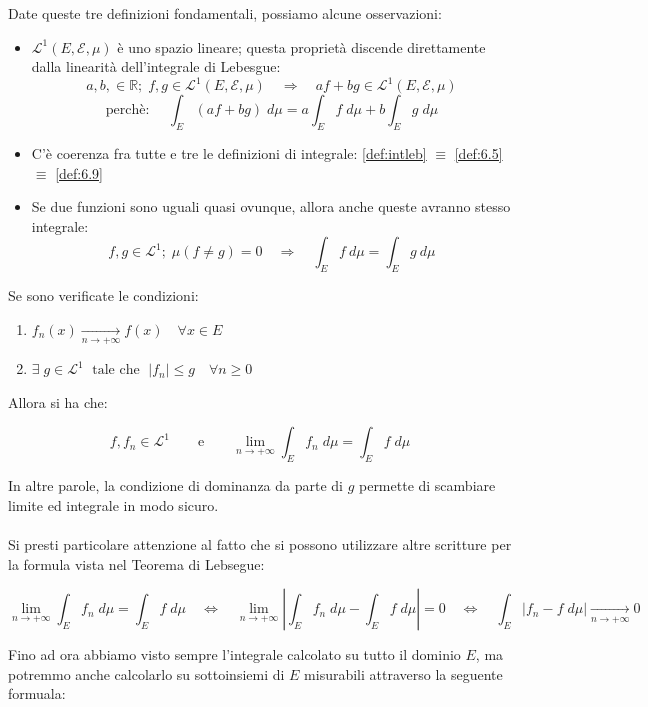 \noindent Date queste tre definizioni fondamentali, possiamo alcune osservazioni:
\begin{itemize}
    \item $\mathcal{L}^1(E, \mathcal{E}, \mu)$ è uno spazio lineare; questa proprietà discende direttamente dalla linearità dell'integrale di Lebesgue:
    \[a, b, \in \mathbb{R};\;f, g\in \mathcal{L}^1(E, \mathcal{E}, \mu) \quad \Rightarrow \quad af+bg\in \mathcal{L}^1(E, \mathcal{E}, \mu)\]
    \[\text{perchè: }\quad \int_E(af+bg)\;d\mu = a\int_Ef\;d\mu + b\int_Eg\;d\mu\]
    \item C'è coerenza fra tutte e tre le definizioni di integrale: \ref {def:intleb} $\equiv$ \ref{def:6.5} $\equiv$ \ref{def:6.9}
    \item Se due funzioni sono uguali quasi ovunque, allora anche queste avranno stesso integrale:
    \[f, g\in\mathcal{L}^1; \;\mu(f\neq g) = 0 \quad \Rightarrow \quad \int_Ef\:d\mu = \int_Eg\:d\mu\]
\end{itemize}

\begin{teorema}
    Se sono verificate le condizioni:
    \begin{enumerate}
        \item $f_n(x) \underset{n\to+\infty}{\longrightarrow} f(x)\quad \forall x \in E$
        \item $\exists \;g\in \mathcal{L}^1\;\text{ tale che }\;|f_n| \leq g\quad\forall n\geq0$
    \end{enumerate}
    Allora si ha che:

    \[f, f_n \in \mathcal{L}^1 \qquad \text{e}\qquad \underset{n\to+\infty}{\lim} \int_E f_n\;d\mu = \int_Ef\;d\mu\]
\end{teorema}

In altre parole, la condizione di dominanza da parte di $g$ permette di scambiare limite ed integrale in modo sicuro.\\
\\
Si presti particolare attenzione al fatto che si possono utilizzare altre scritture per la formula vista nel Teorema di Lebsegue:

\[\underset{n\to+\infty}{\lim} \int_E f_n\;d\mu = \int_Ef\;d\mu\quad\iff \quad \lim_{n\to+\infty}\left|\int_Ef_n\;d\mu - \int_Ef\;d\mu\right| = 0 \quad\iff \quad \int_E \left|f_n-f\;d\mu\right| \underset{n\to+\infty}{\longrightarrow}0\]

\bigskip
\noindent Fino ad ora abbiamo visto sempre l'integrale calcolato su tutto il dominio $E$, ma potremmo anche calcolarlo su sottoinsiemi di $E$ misurabili attraverso la seguente formuala:

